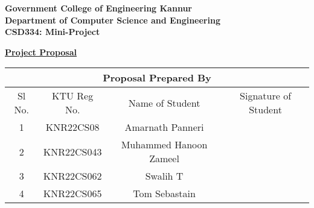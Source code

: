 \documentclass[14pt]{article}
\begin{document}
\begin{center}
\large{\textbf{Government College of Engineering Kannur\\}}
\large{\textbf{Department of Computer Science and Engineering\\}}
\large{\textbf{CSD334: Mini-Project\\}}
\end{center}

\begin{center}
\small{\textbf{\underline{ Project Proposal}\\}}
\end{center}

\begin{table}[ht!]
\begin{center}
\begin{tabular}{|cccc|}
\hline
\multicolumn{4}{|c|}{\textbf{Proposal Prepared By}}                        \\ \hline
\multicolumn{1}{|c|}{Sl No.} & \multicolumn{1}{c|}{KTU Reg No.} & \multicolumn{1}{c|}{Name of Student}              & Signature of Student \\ \hline
\multicolumn{1}{|c|}{1}      & \multicolumn{1}{c|}{KNR22CS08}   & \multicolumn{1}{c|}{Amarnath Panneri} &           \\ \hline
\multicolumn{1}{|c|}{2} & \multicolumn{1}{c|}{KNR22CS043} & \multicolumn{1}{c|}{Muhammed Hanoon Zameel} &  \\ \hline
\multicolumn{1}{|c|}{3} & \multicolumn{1}{c|}{KNR22CS062} & \multicolumn{1}{c|}{Swalih T} &  \\ \hline
\multicolumn{1}{|c|}{4} & \multicolumn{1}{c|}{KNR22CS065} & \multicolumn{1}{c|}{Tom Sebastain} &  \\ \hline
\end{tabular}
\end{center}
\end{table}
\end{document}
